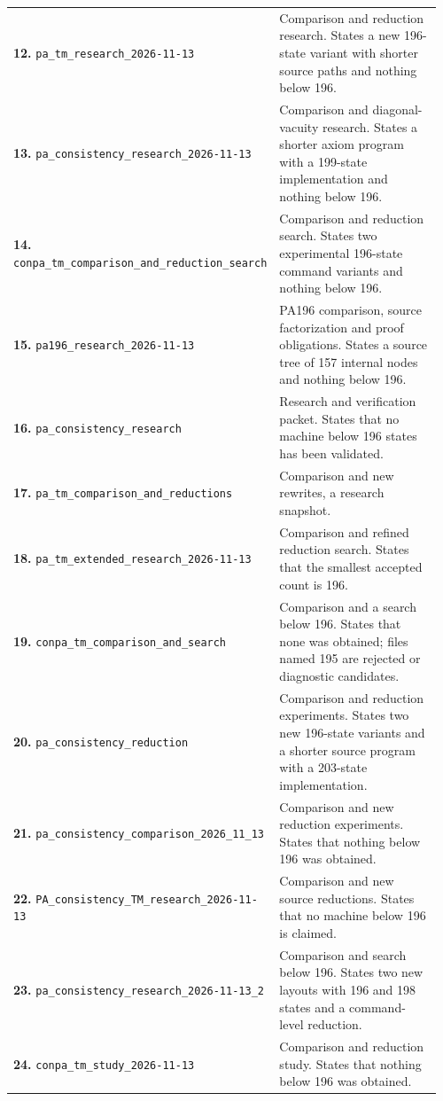 {\begin{longtable}{@{}>{\raggedright\arraybackslash}p{0.37\linewidth}>{\raggedright\arraybackslash}p{0.59\linewidth}@{}}
\textbf{12.} \nolinkurl{pa_tm_research_2026-11-13} & Comparison and reduction research. States a new 196-state variant with shorter source paths and nothing below 196.\\[5pt]
\textbf{13.} \nolinkurl{pa_consistency_research_2026-11-13} & Comparison and diagonal-vacuity research. States a shorter axiom program with a 199-state implementation and nothing below 196.\\[5pt]
\textbf{14.} \nolinkurl{conpa_tm_comparison_and_reduction_search} & Comparison and reduction search. States two experimental 196-state command variants and nothing below 196.\\[5pt]
\textbf{15.} \nolinkurl{pa196_research_2026-11-13} & PA196 comparison, source factorization and proof obligations. States a source tree of 157 internal nodes and nothing below 196.\\[5pt]
\textbf{16.} \nolinkurl{pa_consistency_research} & Research and verification packet. States that no machine below 196 states has been validated.\\[5pt]
\textbf{17.} \nolinkurl{pa_tm_comparison_and_reductions} & Comparison and new rewrites, a research snapshot.\\[5pt]
\textbf{18.} \nolinkurl{pa_tm_extended_research_2026-11-13} & Comparison and refined reduction search. States that the smallest accepted count is 196.\\[5pt]
\textbf{19.} \nolinkurl{conpa_tm_comparison_and_search} & Comparison and a search below 196. States that none was obtained; files named 195 are rejected or diagnostic candidates.\\[5pt]
\textbf{20.} \nolinkurl{pa_consistency_reduction} & Comparison and reduction experiments. States two new 196-state variants and a shorter source program with a 203-state implementation.\\[5pt]
\textbf{21.} \nolinkurl{pa_consistency_comparison_2026_11_13} & Comparison and new reduction experiments. States that nothing below 196 was obtained.\\[5pt]
\textbf{22.} \nolinkurl{PA_consistency_TM_research_2026-11-13} & Comparison and new source reductions. States that no machine below 196 is claimed.\\[5pt]
\textbf{23.} \nolinkurl{pa_consistency_research_2026-11-13_2} & Comparison and search below 196. States two new layouts with 196 and 198 states and a command-level reduction.\\[5pt]
\textbf{24.} \nolinkurl{conpa_tm_study_2026-11-13} & Comparison and reduction study. States that nothing below 196 was obtained.\\[5pt]

\end{longtable}}
